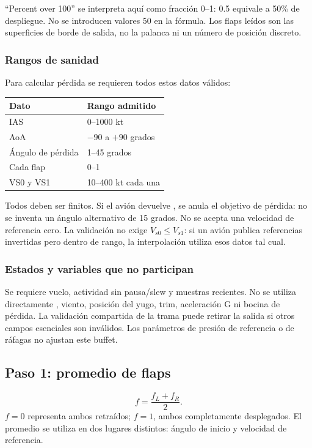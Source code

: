 ``Percent over 100'' se interpreta aquí como fracción 0--1: 0.5 equivale a 50\% de despliegue. No se introducen valores 50 en la fórmula. Los flaps leídos son las superficies de borde de salida, no la palanca ni un número de posición discreto.

\subsubsection{Rangos de sanidad}
Para calcular pérdida se requieren todos estos datos válidos:
\begin{center}\begin{tabular}{ll}
\toprule Dato & Rango admitido\\\midrule
IAS & 0--1000 kt\\
AoA & $-90$ a $+90$ grados\\
Ángulo de pérdida & 1--45 grados\\
Cada flap & 0--1\\
VS0 y VS1 & 10--400 kt cada una\\\bottomrule
\end{tabular}\end{center}
Todos deben ser finitos. Si el avión devuelve , se anula el objetivo de pérdida: no se inventa un ángulo alternativo de 15 grados. No se acepta una velocidad de referencia cero. La validación no exige $V_{s0}\le V_{s1}$: si un avión publica referencias invertidas pero dentro de rango, la interpolación utiliza esos datos tal cual.

\subsubsection{Estados y variables que no participan}
Se requiere vuelo, actividad sin pausa/slew y muestras recientes. No se utiliza directamente , viento, posición del yugo, trim, aceleración G ni bocina de pérdida. La validación compartida de la trama puede retirar la salida si otros campos esenciales son inválidos. Los parámetros de presión de referencia o de ráfagas no ajustan este buffet.

\subsection{Paso 1: promedio de flaps}
\begin{equation}
f=\frac{f_L+f_R}{2}.
\end{equation}
$f=0$ representa ambos retraídos; $f=1$, ambos completamente desplegados. El promedio se utiliza en dos lugares distintos: ángulo de inicio y velocidad de referencia.

